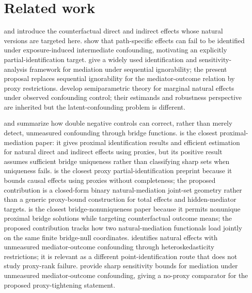 \documentclass[11pt]{article}
\theoremstyle{definition}
\theoremstyle{plain}
\theoremstyle{remark}
\begin{document}
\section{Related work}
\citet{RobinsGreenland1992} and \citet{Pearl2001} introduce the counterfactual direct and indirect effects whose natural versions are targeted here.  \citet{AvinShpitserPearl2005} show that path-specific effects can fail to be identified under exposure-induced intermediate confounding, motivating an explicitly partial-identification target.  \citet{ImaiKeeleYamamoto2010} give a widely used identification and sensitivity-analysis framework for mediation under sequential ignorability; the present proposal replaces sequential ignorability for the mediator-outcome relation by proxy restrictions.  \citet{TchetgenShpitser2012} develop semiparametric theory for marginal natural effects under observed confounding control; their estimands and robustness perspective are inherited but the latent-confounding problem is different.

\citet{MiaoShiLiTchetgen2024} and \citet{PenningDeVriesGroenwold2023} summarize how double negative controls can correct, rather than merely detect, unmeasured confounding through bridge functions.  \citet{DukesShpitserTchetgen2023} is the closest proximal-mediation paper: it gives proximal identification results and efficient estimation for natural direct and indirect effects using proxies, but its positive result assumes sufficient bridge uniqueness rather than classifying sharp sets when uniqueness fails.  \citet{GhassamiShpitserTchetgen2023} is the closest proxy partial-identification preprint because it bounds causal effects using proxies without completeness; the proposed contribution is a closed-form binary natural-mediation joint-set geometry rather than a generic proxy-bound construction for total effects and hidden-mediator targets.  \citet{ZhangLiMiaoTchetgen2023} is the closest bridge-nonuniqueness paper because it permits nonunique proximal bridge solutions while targeting counterfactual outcome means; the proposed contribution tracks how two natural-mediation functionals load jointly on the same finite bridge-null coordinates.  \citet{SunYe2021} identifies natural effects with unmeasured mediator-outcome confounding through heteroskedasticity restrictions; it is relevant as a different point-identification route that does not study proxy-rank failure.  \citet{DingVanderWeele2016} provide sharp sensitivity bounds for mediation under unmeasured mediator-outcome confounding, giving a no-proxy comparator for the proposed proxy-tightening statement.
\end{document}
